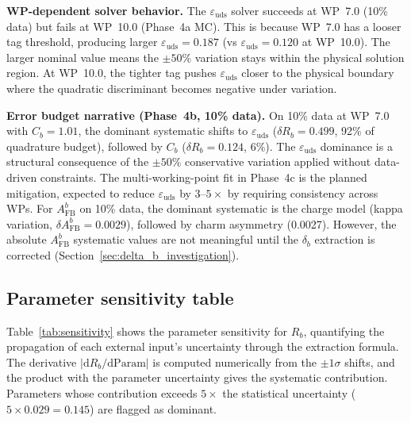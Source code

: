 \documentclass[11pt,a4paper]{article}
\begin{document}
\textbf{WP-dependent solver behavior.} The $\varepsilon_\mathrm{uds}$ solver succeeds
at WP~7.0 (10\% data) but fails at WP~10.0 (Phase~4a MC). This is because WP~7.0
has a looser tag threshold, producing larger $\varepsilon_\mathrm{uds} = 0.187$ (vs
$\varepsilon_\mathrm{uds} = 0.120$ at WP~10.0). The larger nominal value means the
$\pm 50\%$ variation stays within the physical solution region. At WP~10.0, the tighter
tag pushes $\varepsilon_\mathrm{uds}$ closer to the physical boundary where the
quadratic discriminant becomes negative under variation.

\textbf{Error budget narrative (Phase~4b, 10\% data).} On 10\% data at WP~7.0
with $C_b = 1.01$, the dominant systematic shifts to $\varepsilon_\mathrm{uds}$
($\delta R_b = 0.499$, 92\% of quadrature budget), followed by $C_b$ ($\delta R_b = 0.124$, 6\%).
The $\varepsilon_\mathrm{uds}$ dominance is a structural consequence of the
$\pm 50\%$ conservative variation applied without data-driven constraints. The
multi-working-point fit in Phase~4c is the planned mitigation, expected to reduce
$\varepsilon_\mathrm{uds}$ by $3$--$5\times$ by requiring consistency across WPs.
For $A_\mathrm{FB}^b$ on 10\% data, the dominant systematic is the charge model
(kappa variation, $\delta A_\mathrm{FB}^b = 0.0029$), followed by charm asymmetry
(0.0027). However, the absolute $A_\mathrm{FB}^b$ systematic values are not
meaningful until the $\delta_b$ extraction is corrected
(Section~\ref{sec:delta_b_investigation}).

\subsection{Parameter sensitivity table}
\label{sec:sensitivity}

Table~\ref{tab:sensitivity} shows the parameter sensitivity for $R_b$,
quantifying the propagation of each external input's uncertainty through the
extraction formula. The derivative $|\mathrm{d}R_b/\mathrm{d}\mathrm{Param}|$ is
computed numerically from the $\pm 1\sigma$ shifts, and the product with the
parameter uncertainty gives the systematic contribution. Parameters whose
contribution exceeds $5\times$ the statistical uncertainty ($5 \times 0.029 = 0.145$)
are flagged as dominant.
\end{document}
